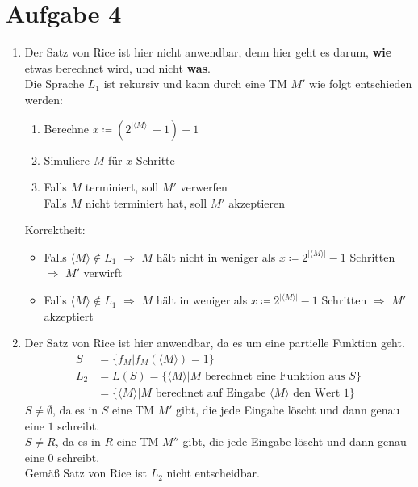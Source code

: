 \documentclass[a4paper,11pt]{scrartcl}
\begin{document}
	\section*{Aufgabe 4}
	\begin{enumerate}[label=(\alph*)]
	\item	Der Satz von Rice ist hier nicht anwendbar, denn hier geht es darum, \textbf{wie} etwas berechnet wird, und nicht \textbf{was}.\\
			Die Sprache $L_1$ ist rekursiv und kann durch eine TM $M'$ wie folgt entschieden werden:
			\begin{enumerate}[label=\arabic*)]
			\item Berechne $x \coloneqq (2^{\vert \langle M \rangle \vert} - 1) - 1$
			\item Simuliere $M$ für $x$ Schritte
			\item Falls $M$ terminiert, soll $M'$ verwerfen\\
				  Falls $M$ nicht terminiert hat, soll $M'$ akzeptieren
			\end{enumerate}
			Korrektheit:
			\begin{itemize}
			\item Falls $\langle M \rangle \not\in L_1$ $\Rightarrow$ $M$ hält nicht in weniger als $x \coloneqq 2^{\vert \langle M \rangle \vert} - 1$ Schritten $\Rightarrow$ $M'$ verwirft
			\item Falls $\langle M \rangle \not\in L_1$ $\Rightarrow$ $M$ hält in weniger als $x \coloneqq 2^{\vert \langle M \rangle \vert} - 1$ Schritten $\Rightarrow$ $M'$ akzeptiert
			\end{itemize}
	
	\item	Der Satz von Rice ist hier anwendbar, da es um eine partielle Funktion geht.\\
			\begin{align*}
			S &=\{f_M \vert f_M(\langle M \rangle) = 1\}\\
			L_2 &= L(S) = \{\langle M \rangle \vert M \text{ berechnet eine Funktion aus } S\}\\
				&= \{\langle M \rangle \vert M \text{ berechnet auf Eingabe } \langle M \rangle \text{ den Wert } 1 \}
			\end{align*}
			$S \neq \emptyset$, da es in $S$ eine TM $M'$ gibt, die jede Eingabe löscht und dann genau eine $1$ schreibt.\\
			$S \neq R$, da es in $R$ eine TM $M''$ gibt, die jede Eingabe löscht und dann genau eine $0$ schreibt.\\
			Gemäß Satz von Rice ist $L_2$ nicht entscheidbar.
	

\end{enumerate}
\end{document}
